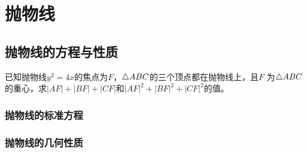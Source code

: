 \section{抛物线}
\subsection{抛物线的方程与性质}

\begin{example}
    已知抛物线\(y^2=4x\)的焦点为\(F\)，\(\triangle ABC\)的三个顶点都在抛物线上，且\(F\)
    为\(\triangle ABC\)的重心，求\(|AF|+|BF|+|CF|\)和\(|AF|^2+|BF|^2+|CF|^2\)的值。
\end{example}









\subsubsection{抛物线的标准方程}
\clearpage
\subsubsection{抛物线的几何性质}
\clearpage
\clearpage
